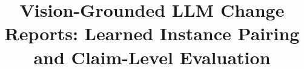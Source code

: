 \documentclass[conference,a4paper]{IEEEtran}
\begin{document}
%
\title{Vision-Grounded LLM Change Reports:
Learned Instance Pairing and Claim-Level Evaluation}

%
%
%
%
\end{document}
